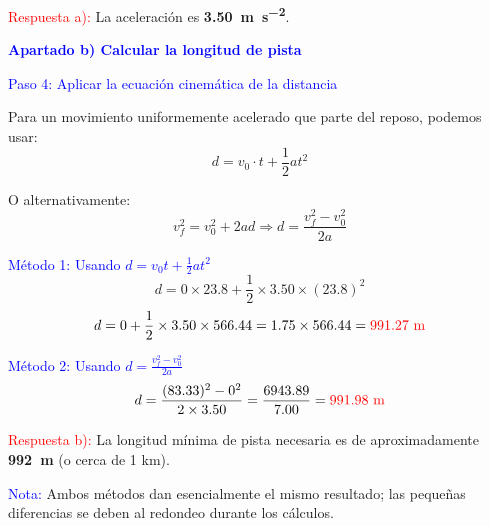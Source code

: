 \begin{exercise}
\begin{solu}
        \textcolor{red}{Respuesta a):} La aceleración es \textbf{\qty{3.50}{\metre\per\second\squared}}.

        \vspace{0.5cm}

        \textbf{\textcolor{blue}{Apartado b) Calcular la longitud de pista}}

        \textcolor{blue}{Paso 4: Aplicar la ecuación cinemática de la distancia}

        Para un movimiento uniformemente acelerado que parte del reposo, podemos usar:
        \[
            \boxed{d = v_0 \cdot t + \frac{1}{2} a t^2}
        \]

        O alternativamente:
        \[
            \boxed{v_f^2 = v_0^2 + 2ad} \Rightarrow d = \frac{v_f^2 - v_0^2}{2a}
        \]

        \textcolor{blue}{Método 1: Usando $d = v_0 t + \frac{1}{2}at^2$}
        \[
            d = 0 \times 23.8 + \frac{1}{2} \times 3.50 \times (23.8)^2
        \]
        \[
            d = 0 + \frac{1}{2} \times 3.50 \times 566.44 = 1.75 \times 566.44 = \textcolor{red}{991.27 \text{ m}}
        \]

        \textcolor{blue}{Método 2: Usando $d = \frac{v_f^2 - v_0^2}{2a}$}
        \[
            d = \frac{(83.33)^2 - 0^2}{2 \times 3.50} = \frac{6943.89}{7.00} = \textcolor{red}{991.98 \text{ m}}
        \]

        \textcolor{red}{Respuesta b):} La longitud mínima de pista necesaria es de aproximadamente \textbf{\qty{992}{\m}} (o cerca de 1 km).

        \textcolor{blue}{Nota:} Ambos métodos dan esencialmente el mismo resultado; las pequeñas diferencias se deben al redondeo durante los cálculos.
    \end{solu}
\end{exercise}


